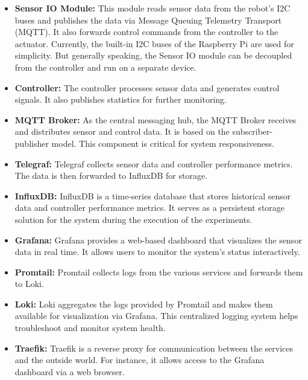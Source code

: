\begin{itemize}
    \item \textbf{Sensor IO Module:}
    This module reads sensor data from the robot's I2C buses and publishes the data via Message Queuing Telemetry Transport (MQTT).
    It also forwards control commands from the controller to the actuator.
    Currently, the built-in I2C buses of the Raspberry Pi are used for simplicity.
    But generally speaking, the Sensor IO module can be decoupled from the controller and run on a separate device.

    \item \textbf{Controller:}
    The controller processes sensor data and generates control signals.
    It also publishes statistics for further monitoring.

    \item \textbf{MQTT Broker:}
    As the central messaging hub, the MQTT Broker receives and distributes sensor and control data.
    It is based on the subscriber-publisher model.
    This component is critical for system responsiveness.

    \item \textbf{Telegraf:}
    Telegraf collects sensor data and controller performance metrics.
    The data is then forwarded to InfluxDB for storage.

    \item \textbf{InfluxDB:}
    InfluxDB is a time-series database that stores historical sensor data and controller performance metrics.
    It serves as a persistent storage solution for the system during the execution of the experiments.

    \item \textbf{Grafana:}
    Grafana provides a web-based dashboard that visualizes the sensor data in real time.
    It allows users to monitor the system's status interactively.

    \item \textbf{Promtail:}
    Promtail collects logs from the various services and forwards them to Loki.

    \item \textbf{Loki:}
    Loki aggregates the logs provided by Promtail and makes them available for visualization via Grafana.
    This centralized logging system helps troubleshoot and monitor system health.

    \item \textbf{Traefik:}
    Traefik is a reverse proxy for communication between the services and the outside world.
    For instance, it allows access to the Grafana dashboard via a web browser.
\end{itemize}


